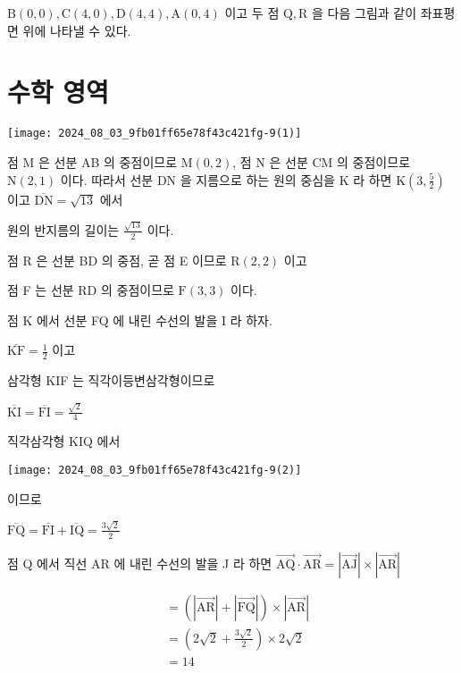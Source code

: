 \documentclass[10pt]{article}
\begin{document}
\(\mathrm{B}(0,0), \mathrm{C}(4,0), \mathrm{D}(4,4), \mathrm{A}(0,4)\) 이고 두 점 \(\mathrm{Q}, \mathrm{R}\) 을 다음 그림과 같이 좌표평면 위에 나타낼 수 있다.

\section*{수학 영역}
\begin{center}
\texttt{[image: 2024\_08\_03\_9fb01ff65e78f43c421fg-9(1)]}
\end{center}

점 M 은 선분 AB 의 중점이므로 \(\mathrm{M}(0,2)\), 점 N 은 선분 CM 의 중점이므로 \(\mathrm{N}(2,1)\) 이다. 따라서 선분 DN 을 지름으로 하는 원의 중심을 K 라 하면 \(\mathrm{K}\left(3, \frac{5}{2}\right)\) 이고 \(\overline{\mathrm{DN}}=\sqrt{13}\) 에서

원의 반지름의 길이는 \(\frac{\sqrt{13}}{2}\) 이다.

점 R 은 선분 BD 의 중점, 곧 점 E 이므로 \(\mathrm{R}(2,2)\) 이고

점 F 는 선분 RD 의 중점이므로 \(\mathrm{F}(3,3)\) 이다.

점 K 에서 선분 FQ 에 내린 수선의 발을 I 라 하자.

\(\overline{\mathrm{KF}}=\frac{1}{2}\) 이고

삼각형 KIF 는 직각이등변삼각형이므로

\(\overline{\mathrm{KI}}=\overline{\mathrm{FI}}=\frac{\sqrt{2}}{4}\)

직각삼각형 KIQ 에서

\begin{center}
\texttt{[image: 2024\_08\_03\_9fb01ff65e78f43c421fg-9(2)]}
\end{center}

이므로

\(\overline{\mathrm{FQ}}=\overline{\mathrm{FI}}+\overline{\mathrm{IQ}}=\frac{3 \sqrt{2}}{2}\)

점 Q 에서 직선 AR 에 내린 수선의 발을 J 라 하면 \(\overrightarrow{\mathrm{AQ}} \cdot \overrightarrow{\mathrm{AR}}=|\overrightarrow{\mathrm{AJ}}| \times|\overrightarrow{\mathrm{AR}}|\)

\[
\begin{aligned}
& =(|\overrightarrow{\mathrm{AR}}|+|\overrightarrow{\mathrm{FQ}}|) \times|\overrightarrow{\mathrm{AR}}| \\
& =\left(2 \sqrt{2}+\frac{3 \sqrt{2}}{2}\right) \times 2 \sqrt{2} \\
& =14
\end{aligned}
\]
\end{document}
